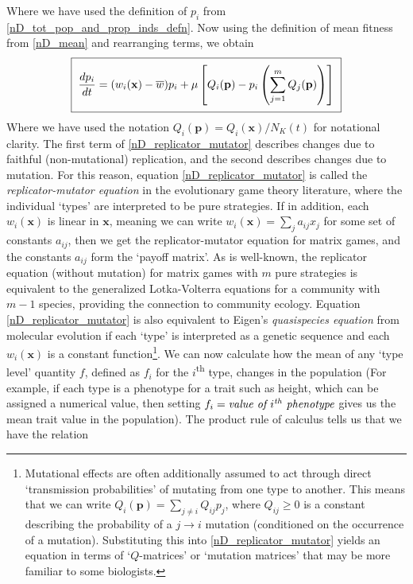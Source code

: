 Where we have used the definition of $p_i$ from \eqref{nD_tot_pop_and_prop_inds_defn}. Now using the definition of mean fitness from \eqref{nD_mean} and rearranging terms, we obtain
\begin{equation}
\label{nD_replicator_mutator}
\setlength{\fboxsep}{2\fboxsep}\boxed{\frac{dp_i}{dt} = (w_i(\mathbf{x}) - \overline{w})p_i + \mu\left[Q_i(\mathbf{p}) - p_i\left(\sum\limits_{j=1}^{m}Q_j(\mathbf{p})\right)\right]}
\end{equation}
Where we have used the notation $Q_i(\mathbf{p}) = Q_i(\mathbf{x})/N_K(t)$ for notational clarity. The first term of \eqref{nD_replicator_mutator} describes changes due to faithful (non-mutational) replication, and the second describes changes due to mutation. For this reason, equation \eqref{nD_replicator_mutator} is called the \emph{replicator-mutator equation} in the evolutionary game theory literature, where the individual `types' are interpreted to be pure strategies. If in addition, each $w_i(\mathbf{x})$ is linear in $\mathbf{x}$, meaning we can write $w_i(\mathbf{x}) = \sum_{j}a_{ij}x_j$ for some set of constants $a_{ij}$, then we get the replicator-mutator equation for matrix games, and the constants $a_{ij}$ form the `payoff matrix'. As is well-known, the replicator equation (without mutation) for matrix games with $m$ pure strategies is equivalent to the generalized Lotka-Volterra equations for a community with $m-1$ species\citep{hofbauer_evolutionary_1998}, providing the connection to community ecology.  Equation \eqref{nD_replicator_mutator} is also equivalent to Eigen's \emph{quasispecies equation} from molecular evolution if each `type' is interpreted as a genetic sequence and each $w_i(\mathbf{x})$ is a constant function\footnote{Mutational effects are often additionally assumed to act through direct `transmission probabilities' of mutating from one type to another. This means that we can write $Q_i(\mathbf{p}) = \sum\limits_{j\neq i}Q_{ij}p_j$, where $Q_{ij} \geq0$ is a constant describing the probability of a $j \to i$ mutation (conditioned on the occurrence of a mutation). Substituting this into \eqref{nD_replicator_mutator} yields an equation in terms of `$Q$-matrices' or `mutation matrices' that may be more familiar to some biologists.}. We can now calculate how the mean of any `type level' quantity $f$, defined as $f_i$ for the $i$\textsuperscript{th} type, changes in the population (For example, if each type is a phenotype for a trait such as height, which can be assigned a numerical value, then setting $f_i = \textit{value of $i\textsuperscript{th}$ phenotype}$ gives us the mean trait value in the population). The product rule of calculus tells us that we have the relation
